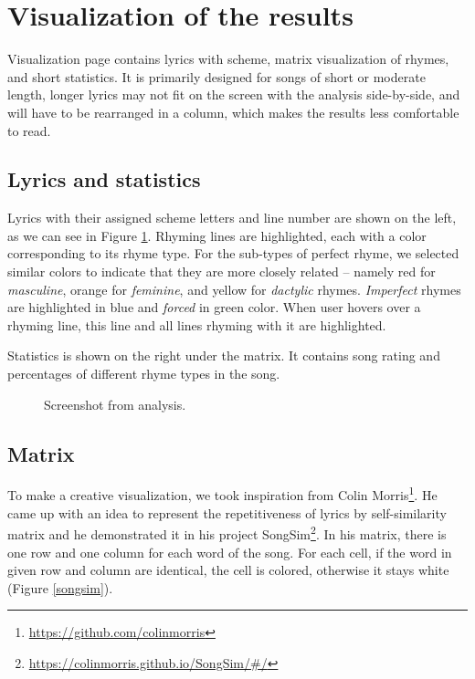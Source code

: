 \section{Visualization of the results}
Visualization page contains lyrics with scheme, matrix visualization of rhymes, and short statistics. It is primarily designed for songs of short or moderate length, longer lyrics may not fit on the screen with the analysis side-by-side, and will have to be rearranged in a column, which makes the results less comfortable to read.

\subsection{Lyrics and statistics}
Lyrics with their assigned scheme letters and line number are shown on the left, as we can see in Figure \ref{web-analysis_window5}. Rhyming lines are highlighted, each with a color corresponding to its rhyme type. For the sub-types of perfect rhyme, we selected similar colors to indicate that they are more closely related -- namely red for \textit{masculine}, orange for \textit{feminine}, and yellow for \textit{dactylic} rhymes. \textit{Imperfect} rhymes are highlighted in blue and \textit{forced} in green color. When user hovers over a rhyming line, this line and all lines rhyming with it are highlighted.

Statistics is shown on the right under the matrix. It contains song rating and percentages of different rhyme types in the song.

\begin{figure}[h]\centering
	\caption{Screenshot from analysis.}
	\label{web-analysis_window5}
\end{figure}

\subsection{Matrix}
To make a creative visualization, we took inspiration from Colin Morris\footnote{\url{https://github.com/colinmorris}}. He came up with an idea to represent the repetitiveness of lyrics by self-similarity matrix and he demonstrated it in his project SongSim\footnote{\url{https://colinmorris.github.io/SongSim/\#/}}. In his matrix, there is one row and one column for each word of the song. For each cell, if the word in given row and column are identical, the cell is colored, otherwise it stays white (Figure \ref{songsim}).

